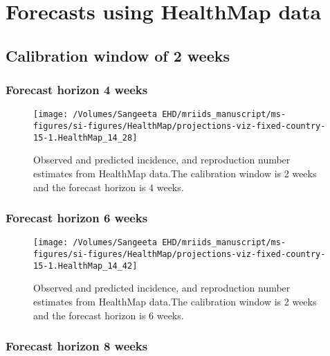 \documentclass[9pt,twoside,lineno]{pnas-new}
\begin{document}
\hypertarget{forecasts-using-healthmap-data}{%
  \section{Forecasts using HealthMap data}\label{forecasts-using-healthmap-data}}

\hypertarget{calibration-window-of-2-weeks-1}{%
  \subsection{Calibration window of 2 weeks}\label{calibration-window-of-2-weeks-1}}

\hypertarget{forecast-horizon-4-weeks-2}{%
  \subsubsection{Forecast horizon 4 weeks}\label{forecast-horizon-4-weeks-2}}

\begin{figure}
  {
    \centering \texttt{[image: /Volumes/Sangeeta EHD/mriids\_manuscript/ms-figures/si-figures/HealthMap/projections-viz-fixed-country-15-1.HealthMap\_14\_28]} 
  }
  \caption{Observed and predicted incidence, and reproduction number
    estimates from HealthMap data.The calibration window is 2 weeks
    and the forecast horizon is 4 weeks.}
  \label{fig:hm24}
\end{figure}

\hypertarget{forecast-horizon-6-weeks-3}{%
  \subsubsection{Forecast horizon 6 weeks}\label{forecast-horizon-6-weeks-3}}

\begin{figure}

  {
    \centering \texttt{[image: /Volumes/Sangeeta EHD/mriids\_manuscript/ms-figures/si-figures/HealthMap/projections-viz-fixed-country-15-1.HealthMap\_14\_42]} 
  }
  \caption{Observed and predicted incidence, and
    reproduction number estimates from HealthMap data.The calibration
    window is 2 weeks and the forecast horizon is 6 weeks.}
    \label{fig:hm26}
\end{figure}

\hypertarget{forecast-horizon-8-weeks-3}{%
  \subsubsection{Forecast horizon 8 weeks}\label{forecast-horizon-8-weeks-3}}
\end{document}
